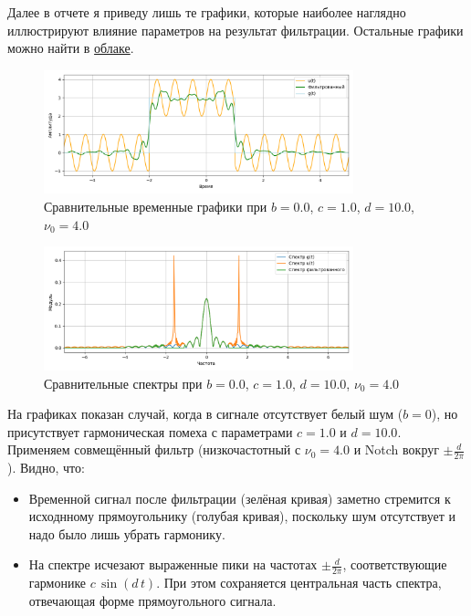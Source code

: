 \documentclass[a4paper]{article}
\begin{document}
Далее в отчете я приведу лишь те графики, которые наиболее наглядно иллюстрируют влияние параметров на результат фильтрации. Остальные графики можно найти в \href{https://drive.google.com/drive/folders/1fi6P5S0JTVP9--mFtsujHoE6mchsh4uM?usp=sharing}{облаке}.
\begin{figure}[H]
    \centering
    \includegraphics[width=0.8\textwidth]{src/npf/time_0_1.0_10.0_4.0.png}
    \caption{Сравнительные временные графики при $b=0.0$, $c=1.0$, $d=10.0$, $\nu_0=4.0$}
\end{figure}
\begin{figure}[H]
    \centering
    \includegraphics[width=0.8\textwidth]{src/npf/spec_0_1.0_10.0_4.0.png}
    \caption{Сравнительные спектры при $b=0.0$, $c=1.0$, $d=10.0$, $\nu_0=4.0$}
\end{figure}
На графиках показан случай, когда в сигнале отсутствует белый шум ($b=0$), но присутствует гармоническая помеха с параметрами $c=1.0$ и $d=10.0$. Применяем совмещённый фильтр (низкочастотный с $\nu_0=4.0$ и Notch вокруг $\pm \frac{d}{2\pi}$). Видно, что:
\begin{itemize}
    \item Временной сигнал после фильтрации (зелёная кривая) заметно стремится к исходнному прямоугольнику (голубая кривая), поскольку шум отсутствует и надо было лишь убрать гармонику.
    \item На спектре исчезают выраженные пики на частотах $\pm \frac{d}{2\pi}$, соответствующие гармонике $c\,\sin(d\,t)$. При этом сохраняется центральная часть спектра, отвечающая форме прямоугольного сигнала.
\end{itemize}
\end{document}
